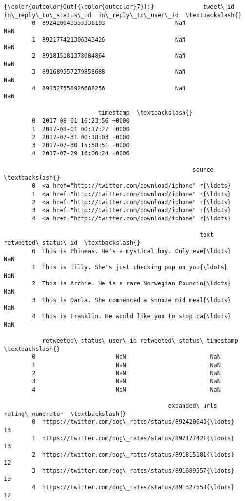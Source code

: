\documentclass[11pt]{article}
\begin{document}
\begin{Verbatim}[commandchars=\\\{\}]
{\color{outcolor}Out[{\color{outcolor}7}]:}              tweet\_id  in\_reply\_to\_status\_id  in\_reply\_to\_user\_id  \textbackslash{}
        0  892420643555336193                    NaN                  NaN   
        1  892177421306343426                    NaN                  NaN   
        2  891815181378084864                    NaN                  NaN   
        3  891689557279858688                    NaN                  NaN   
        4  891327558926688256                    NaN                  NaN   
        
                           timestamp  \textbackslash{}
        0  2017-08-01 16:23:56 +0000   
        1  2017-08-01 00:17:27 +0000   
        2  2017-07-31 00:18:03 +0000   
        3  2017-07-30 15:58:51 +0000   
        4  2017-07-29 16:00:24 +0000   
        
                                                      source  \textbackslash{}
        0  <a href="http://twitter.com/download/iphone" r{\ldots}   
        1  <a href="http://twitter.com/download/iphone" r{\ldots}   
        2  <a href="http://twitter.com/download/iphone" r{\ldots}   
        3  <a href="http://twitter.com/download/iphone" r{\ldots}   
        4  <a href="http://twitter.com/download/iphone" r{\ldots}   
        
                                                        text  retweeted\_status\_id  \textbackslash{}
        0  This is Phineas. He's a mystical boy. Only eve{\ldots}                  NaN   
        1  This is Tilly. She's just checking pup on you{\ldots}                  NaN   
        2  This is Archie. He is a rare Norwegian Pouncin{\ldots}                  NaN   
        3  This is Darla. She commenced a snooze mid meal{\ldots}                  NaN   
        4  This is Franklin. He would like you to stop ca{\ldots}                  NaN   
        
           retweeted\_status\_user\_id retweeted\_status\_timestamp  \textbackslash{}
        0                       NaN                        NaN   
        1                       NaN                        NaN   
        2                       NaN                        NaN   
        3                       NaN                        NaN   
        4                       NaN                        NaN   
        
                                               expanded\_urls  rating\_numerator  \textbackslash{}
        0  https://twitter.com/dog\_rates/status/892420643{\ldots}                13   
        1  https://twitter.com/dog\_rates/status/892177421{\ldots}                13   
        2  https://twitter.com/dog\_rates/status/891815181{\ldots}                12   
        3  https://twitter.com/dog\_rates/status/891689557{\ldots}                13   
        4  https://twitter.com/dog\_rates/status/891327558{\ldots}                12   
        

\end{Verbatim}
\end{document}
